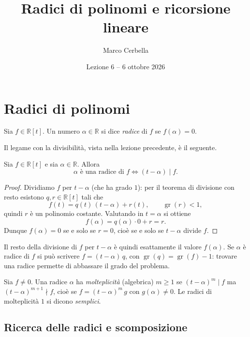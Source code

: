 \documentclass[11pt,a4paper]{article}
\title{Radici di polinomi e ricorsione lineare}
\author{Marco Cerbella}
\date{Lezione 6 -- 6 ottobre 2026}
\begin{document}
\maketitle

\section{Radici di polinomi}

\begin{definizione}
Sia $f \in \mathbb{R}[t]$. Un numero $\alpha \in \mathbb{R}$ si dice \emph{radice}
di $f$ se $f(\alpha) = 0$.
\end{definizione}

Il legame con la divisibilità, vista nella lezione precedente, è il seguente.

\begin{teorema}
Sia $f \in \mathbb{R}[t]$ e sia $\alpha \in \mathbb{R}$. Allora
\[
  \alpha \text{ è una radice di } f
  \iff
  (t - \alpha) \mid f .
\]
\end{teorema}

\begin{proof}
Dividiamo $f$ per $t - \alpha$ (che ha grado $1$): per il teorema di divisione
con resto esistono $q, r \in \mathbb{R}[t]$ tali che
\[
  f(t) = q(t)\,(t - \alpha) + r(t), \qquad \operatorname{gr}(r) < 1 ,
\]
quindi $r$ è un polinomio costante. Valutando in $t = \alpha$ si ottiene
\[
  f(\alpha) = q(\alpha)\cdot 0 + r = r .
\]
Dunque $f(\alpha) = 0$ se e solo se $r = 0$, cioè se e solo se $t - \alpha$
divide $f$.
\end{proof}

\begin{osservazione}
Il resto della divisione di $f$ per $t - \alpha$ è quindi esattamente il valore
$f(\alpha)$. Se $\alpha$ è radice di $f$ si può scrivere $f = (t - \alpha)\, q$,
con $\operatorname{gr}(q) = \operatorname{gr}(f) - 1$: trovare una radice
permette di abbassare il grado del problema.
\end{osservazione}

\begin{definizione}
Sia $f \neq 0$. Una radice $\alpha$ ha \emph{molteplicità} (algebrica)
$m \geq 1$ se $(t - \alpha)^m \mid f$ ma $(t - \alpha)^{m+1} \nmid f$, cioè se
$f = (t - \alpha)^m\, g$ con $g(\alpha) \neq 0$. Le radici di molteplicità $1$
si dicono \emph{semplici}.
\end{definizione}

\subsection{Ricerca delle radici e scomposizione}
\end{document}
